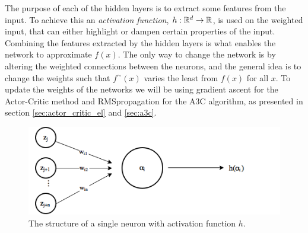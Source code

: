 \documentclass[11pt]{article}
\begin{document}
The purpose of each of the hidden layers is to extract some features from the input.
To achieve this an \textit{activation function}, $h: \mathbb{R}^d \to \mathbb{R}$, is used on the weighted
input, that can either highlight or dampen
certain properties of the input.
Combining the features extracted by the hidden layers is what enables the network
to approximate $f(x)$.
The only way to change the network is by altering the weighted connections
between the neurons, and the general idea is to change the weights such that
$f^\sim(x)$ varies the least from $f(x)$ for all $x$.
To update the weights of the networks we will be using gradient ascent
for the Actor-Critic method and RMSpropagation for the A3C algorithm,
as presented in section \ref{sec:actor_critic_el} and \ref{sec:a3c}.
\begin{figure}[!h]
    \centering
    \includegraphics[width=12cm]{include/neuron.png}
    \caption{The structure of a single neuron with activation function $h$.}
    \label{fig:neuron}
\end{figure}
\end{document}
